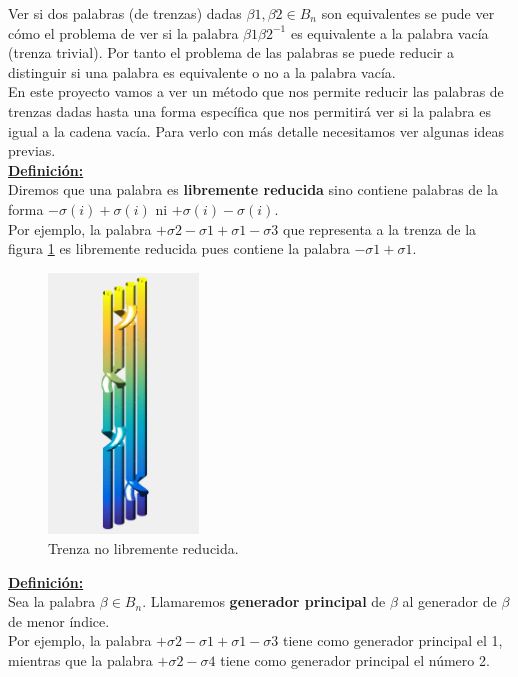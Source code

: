 \documentclass[14pt]{extarticle}
\begin{document}
Ver si dos palabras (de trenzas) dadas $\beta1, \beta2 \in B_{n}$ son equivalentes se pude ver cómo el problema de ver si la palabra $\beta1\beta2^{-1}$ es equivalente a la palabra vacía (trenza trivial). Por tanto el problema de las palabras se puede reducir a distinguir si una palabra es equivalente o no a la palabra vacía. \\

En este proyecto vamos a ver un método que nos permite reducir las palabras de trenzas dadas hasta una forma específica que nos permitirá ver si la palabra es igual a la cadena vacía. Para verlo con más detalle necesitamos ver algunas ideas previas.\\

\underline{\textbf{Definición:}}\\
Diremos que una palabra es \textbf{libremente reducida} sino contiene palabras de la forma $ -\sigma(i)+\sigma(i) $ ni $+\sigma(i)-\sigma(i)$.\\

Por ejemplo, la palabra $+\sigma2-\sigma1+\sigma1-\sigma3$ que representa a la trenza de la figura \ref{deh1} es libremente reducida pues contiene la palabra $-\sigma1+\sigma1$.\\

	\begin{figure}[h!]
		\centering
		\includegraphics[width=4cm]{itrenzas/deh1.png}
		\caption{Trenza no libremente reducida.}
		\label{deh1} 
	\end{figure}

\underline{\textbf{Definición:}}\\
Sea la palabra $\beta \in B_{n}$. Llamaremos \textbf{generador principal} de $\beta$ al generador de $\beta$ de menor índice.\\

Por ejemplo, la palabra $+\sigma2-\sigma1+\sigma1-\sigma3$ tiene como generador principal el 1, mientras que la palabra $+\sigma2-\sigma4$ tiene como generador principal el número 2. \\
\end{document}
